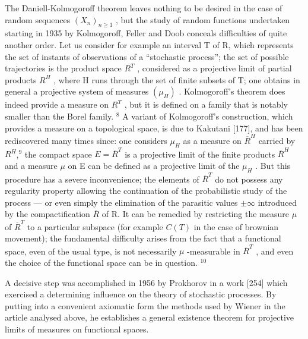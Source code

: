 The Daniell-Kolmogoroff theorem leaves nothing to be desired in the case of random sequences \((X_{n})_{n\geq1}\) , but the study of random functions undertaken starting in 1935 by Kolmogoroff, Feller and Doob conceals difficulties of quite another order. Let us consider for example an interval T of R, which represents the set of instants of observations of a ``stochastic process''; the set of possible trajectories is the product space \(R^{T}\) , considered as a projective limit of partial products \(R^{H}\) , where H runs through the set of finite subsets of T; one obtains in general a projective system of measures \((\mu_{H})\) . Kolmogoroff's theorem does indeed provide a measure on \(R^{T}\) , but it is defined on a family that is notably smaller than the Borel family. \(^{8}\) A variant of Kolmogoroff's construction, which provides a measure on a topological space, is due to Kakutani {[}177{]}, and has been rediscovered many times since: one considers \(\mu_{H}\) as a measure on \(\overline{R}^{H}\) carried by \(R^{H}\),\(^{9}\) the compact space \(E=\overline{R}^{T}\) is a projective limit of the finite products \(\overline{R}^{H}\) and a measure \(\mu\) on E can be defined as a projective limit of the \(\mu_{H}\) . But this procedure has a severe inconvenience; the elements of \(\overline{R}^{T}\) do not possess any regularity property allowing the continuation of the probabilistic study of the process --- or even simply the elimination of the parasitic values \(\pm\infty\) introduced by the compactification \(\overline{R}\) of R. It can be remedied by restricting the measure \(\mu\) of \(\overline{R}^{T}\) to a particular subspace (for example \(C(T)\) in the case of brownian movement); the fundamental difficulty arises from the fact that a functional space, even of the usual type, is not necessarily \(\mu\) -measurable in \(\overline{R}^{T}\) , and even the choice of the functional space can be in question. \(^{10}\)

A decisive step was accomplished in 1956 by Prokhorov in a work {[}254{]} which exercised a determining influence on the theory of stochastic processes. By putting into a convenient axiomatic form the methods used by Wiener in the article analysed above, he establishes a general existence theorem for projective limits of measures on functional spaces.

